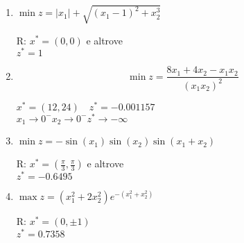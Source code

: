 \documentclass[italian,12pt]{article}
\begin{document}
\begin{enumerate}
	\item 
	\begin{minipage}{0.50\textwidth}
		$\min z = |x_1| + \sqrt{(x_1 - 1)^2 + x_2^3}$
	\end{minipage}
	\begin{minipage}{0.40\textwidth}
		\begin{flushright}
			R: $x^* = (0, 0)$ e altrove\\
			$z^* = 1$
		\end{flushright}
	\end{minipage}

	\item 
	\begin{minipage}{0.50\textwidth}
		\[\min z = \frac{8 x_1 + 4 x_2 - x_1 x_2}{(x_1 x_2)^2} \]
	\end{minipage}
	\begin{minipage}{0.40\textwidth}
		\begin{flushright}
			$x^* = (12, 24)\quad z^*=-0.001157$\\
			$x_1 \rightarrow 0^- x_2 \rightarrow 0^- z^* \rightarrow -\infty$
		\end{flushright}
	\end{minipage}
	
	\item 
	\begin{minipage}{0.50\textwidth}
		$\min z = - \sin(x_1) \sin(x_2) \sin(x_1 + x_2)$
	\end{minipage}
	\begin{minipage}{0.40\textwidth}
		\begin{flushright}
			R: $x^* = (\frac{\pi}{3}, \frac{\pi}{3})$ e altrove\\
			$z^* = -0.6495$
		\end{flushright}
	\end{minipage}
	
	\item 
	\begin{minipage}{0.50\textwidth}
		$\max z = (x_1^2 + 2 x_2^2)e^{-(x_1^2 + x_2^2)}$
	\end{minipage}
	\begin{minipage}{0.40\textwidth}
		\begin{flushright}
			R: $x^* = (0, \pm 1)$\\
			$z^* =0.7358$
		\end{flushright}
	\end{minipage}
	

\end{enumerate}
\end{document}
